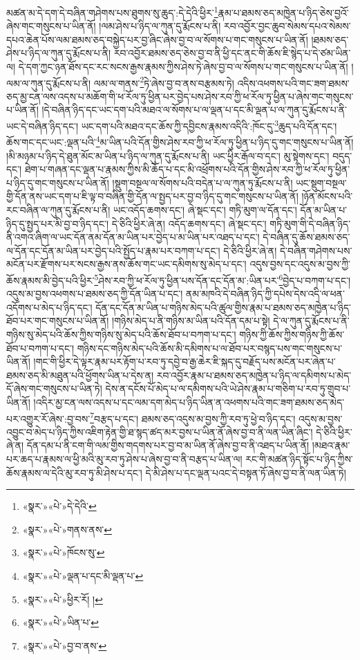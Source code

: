མཚན་མ་དེ་དག་དེ་བཞིན་གཤེགས་པས་ཐུགས་སུ་ཆུད་:དེ་དེའི་ཕྱིར་\footnote{«སྣར་»«པེ་»དེ་དེའི་}རྣམ་པ་ཐམས་ཅད་མཁྱེན་པ་ཉིད་ཅེས་བྱའོ་ཞེས་གང་གསུངས་པ་ཡིན་ནོ། །ལམ་ཤེས་པ་ཉིད་ལ་ཀུན་དུ་རྨོངས་པ་ནི། རབ་འབྱོར་བྱང་ཆུབ་སེམས་དཔའ་སེམས་དཔའ་ཆེན་པོས་ལམ་ཐམས་ཅད་བསྐྱེད་པར་བྱ་ཞིང་ཞེས་བྱ་བ་ལ་སོགས་པ་གང་གསུངས་པ་ཡིན་ནོ། །ཐམས་ཅད་ཤེས་པ་ཉིད་ལ་ཀུན་དུ་རྨོངས་པ་ནི། རབ་འབྱོར་ཐམས་ཅད་ཅེས་བྱ་བ་ནི་ཕྱི་དང་ནང་གི་ཆོས་ཇི་སྙེད་པ་དེ་ཙམ་ཡིན་ལ། དེ་དག་ཀྱང་ཉན་ཐོས་དང་རང་སངས་རྒྱས་རྣམས་ཀྱིས་ཤེས་ཏེ་ཞེས་བྱ་བ་ལ་སོགས་པ་གང་གསུངས་པ་ཡིན་ནོ། །ལམ་ལ་ཀུན་དུ་རྨོངས་པ་ནི། ལམ་ལ་གནས་\footnote{«སྣར་»«པེ་»གནས་ནས་}ཏེ་ཞེས་བྱ་བ་ནས་བརྩམས་ཏེ། འདིས་འཕགས་པའི་གང་ཟག་ཐམས་ཅད་མྱ་ངན་ལས་འདས་པ་མཆོག་གི་ཕ་རོལ་ཏུ་ཕྱིན་པར་བྱེད་པས་ཤེས་རབ་ཀྱི་ཕ་རོལ་ཏུ་ཕྱིན་པ་ཞེས་གང་གསུངས་པ་ཡིན་ནོ། །དེ་བཞིན་ཉིད་དང་ཡང་དག་པའི་མཐའ་ལ་སོགས་པ་ལ་ལྡན་པ་དང་མི་ལྡན་པ་ལ་ཀུན་དུ་རྨོངས་པ་ནི་ཡང་དེ་བཞིན་ཉིད་དང་། ཡང་དག་པའི་མཐའ་དང་ཆོས་ཀྱི་དབྱིངས་རྣམས་འདིའི་:ཁོང་དུ་\footnote{«སྣར་»«པེ་»ཁོངས་སུ་}ཆུད་པའི་དོན་དང་། ཆོས་གང་དང་ཡང་:ལྡན་པའི་\footnote{«སྣར་»«པེ་»ལྡན་པ་དང་མི་ལྡན་པ་}མ་ཡིན་པའི་དོན་གྱིས་ཤེས་རབ་ཀྱི་ཕ་རོལ་ཏུ་ཕྱིན་པ་ཉིད་དུ་གང་གསུངས་པ་ཡིན་ནོ། །མི་མཉམ་པ་ཉིད་དེ་ཐུན་མོང་མ་ཡིན་པ་ཉིད་ལ་ཀུན་དུ་རྨོངས་པ་ནི། ཡང་ཕྱིར་རྒོལ་བ་དང་། མུ་སྟེགས་དང་། བདུད་དང་། ཐེག་པ་གཞན་དང་ལྡན་པ་རྣམས་ཀྱིས་མི་ཆོད་པ་དང་མི་འཕྲོགས་པའི་དོན་གྱིས་ཤེས་རབ་ཀྱི་ཕ་རོལ་ཏུ་ཕྱིན་པ་ཉིད་དུ་གང་གསུངས་པ་ཡིན་ནོ། །སྡུག་བསྔལ་ལ་སོགས་པའི་བདེན་པ་ལ་ཀུན་ཏུ་རྨོངས་པ་ནི། ཡང་སྡུག་བསྔལ་གྱི་དོན་ནས་ཡང་དག་པ་ཇི་ལྟ་བ་བཞིན་གྱི་དོན་ལ་སྤྱད་པར་བྱ་བ་ཉིད་དུ་གང་གསུངས་པ་ཡིན་ནོ། །ཉོན་མོངས་པའི་རང་བཞིན་ལ་ཀུན་དུ་རྨོངས་པ་ནི། ཡང་འདོད་ཆགས་དང་། ཞེ་སྡང་དང་། གཏི་མུག་ལ་དོན་དང་། དོན་མ་ཡིན་པ་ཉིད་དུ་སྤྱད་པར་མི་བྱ་བ་ཉིད་དང་། དེ་ཅིའི་ཕྱིར་ཞེ་ན། འདོད་ཆགས་དང་། ཞེ་སྡང་དང་། གཏི་མུག་གི་དེ་བཞིན་ཉིད་ནི་འགའ་ཞིག་ལ་ཡང་དོན་ནམ་དོན་མ་ཡིན་པར་བྱེད་པ་མ་ཡིན་པར་འཐད་པ་དང་། དེ་བཞིན་དུ་ཆོས་ཐམས་ཅད་ལ་དོན་དང་དོན་མ་ཡིན་པར་བྱེད་པའི་སྤྱོད་པ་རྣམ་པར་བཀག་པ་དང་། དེ་ཅིའི་ཕྱིར་ཞེ་ན། དེ་བཞིན་གཤེགས་པས་མངོན་པར་རྫོགས་པར་སངས་རྒྱས་ནས་ཆོས་གང་ཡང་དམིགས་སུ་མེད་པ་དང་། འདུས་བྱས་དང་འདུས་མ་བྱས་ཀྱི་ཆོས་རྣམས་མི་བྱེད་པའི་ཕྱིར་\footnote{«སྣར་»«པེ་»ཕྱིར་རོ། །}ཤེས་རབ་ཀྱི་ཕ་རོལ་ཏུ་ཕྱིན་པས་དོན་དང་དོན་མ་:ཡིན་པར་\footnote{«སྣར་»«པེ་»ཡིན་པ་}བྱེད་པ་བཀག་པ་དང་། འདུས་མ་བྱས་འཕགས་པ་ཐམས་ཅད་ཀྱི་དོན་ཡིན་པ་དང་། ནམ་མཁའི་དེ་བཞིན་ཉིད་ཀྱི་དཔེས་དེས་འདི་ལ་ཕན་འདོགས་པ་མེད་པ་ཉིད་དང་། དོན་དང་དོན་མ་ཡིན་པ་གཉིས་མེད་པའི་ཚུལ་གྱིས་རྣམ་པ་ཐམས་ཅད་མཁྱེན་པ་ཉིད་ཐོབ་པར་གང་གསུངས་པ་ཡིན་ནོ། །གཉིས་མེད་པ་ནི་གཉིས་མ་ཡིན་པའི་དོན་དམ་པ་སྟེ། དེ་ལ་ཀུན་དུ་རྨོངས་པ་ནི་གཉིས་སུ་མེད་པའི་ཆོས་ཀྱིས་གཉིས་སུ་མེད་པའི་ཆོས་ཐོབ་པ་བཀག་པ་དང་། གཉིས་ཀྱི་ཆོས་ཀྱིས་གཉིས་ཀྱི་ཆོས་ཐོབ་པ་བཀག་པ་དང་། གཉིས་དང་གཉིས་མེད་པའི་ཆོས་མི་དམིགས་པ་ལ་ཐོབ་པར་བསྙད་པས་གང་གསུངས་པ་ཡིན་ནོ། །གང་གི་ཕྱིར་དེ་ལྟར་རྣམ་པར་རྟོག་པ་རབ་ཏུ་དབྱེ་བ་རྒྱ་ཆེར་ཇི་སྐད་དུ་བརྗོད་པས་མངོན་པར་ཞེན་པ་ཐམས་ཅད་མི་མཐུན་པའི་ཕྱོགས་ཡིན་པ་དེས་ན། རབ་འབྱོར་རྣམ་པ་ཐམས་ཅད་མཁྱེན་པ་ཉིད་ལ་དམིགས་པ་མེད་དོ་ཞེས་གང་གསུངས་པ་ཡིན་ཏེ། དེས་ན་དངོས་པོ་མེད་པ་ལ་དམིགས་པའི་ཡེ་ཤེས་རྣམ་པ་གཅིག་པ་རབ་ཏུ་གྲུབ་པ་ཡིན་ནོ། །འདིར་མྱ་ངན་ལས་འདས་པ་དང་ལམ་དག་མེད་པ་ཉིད་ཡིན་ན་འཕགས་པའི་གང་ཟག་ཐམས་ཅད་མེད་པར་འགྱུར་རོ་ཞེས་:བྱ་བས་\footnote{«སྣར་»«པེ་»བྱ་བ་ནས་}བརྩད་པ་དང་། ཐམས་ཅད་འདུས་མ་བྱས་ཀྱི་རབ་ཏུ་ཕྱེ་བ་ཉིད་དང་། འདུས་མ་བྱས་འབྱུང་བ་མེད་པ་ཉིད་ཀྱིས་འཇིག་རྟེན་གྱི་ཐ་སྙད་ཚད་མར་བྱས་པ་ཡིན་ནོ་ཞེས་བྱ་བ་ནི་ལན་ཡིན་ཞིང་། དེ་ཅིའི་ཕྱིར་ཞེ་ན། དོན་དམ་པ་ནི་ངག་གི་ལམ་གྱིས་གདགས་པར་བྱ་བ་མ་ཡིན་ནོ་ཞེས་བྱ་བ་ནི་འཐད་པ་ཡིན་ནོ། །མཐའ་རྣམ་པར་ཆད་པ་རྣམས་ལ་ཕྱི་མའི་མུ་རབ་ཏུ་ཤེས་པ་ཞེས་བྱ་བ་ནི་བརྩད་པ་ཡིན་ལ། རང་གི་མཚན་ཉིད་སྟོང་པ་ཉིད་ཀྱིས་ཆོས་རྣམས་ལ་དེའི་མུ་རབ་ཏུ་མི་ཤེས་པ་དང་། དེ་མི་ཤེས་པ་དང་ལྡན་པའང་དེ་བསྟན་ཏོ་ཞེས་བྱ་བ་ནི་ལན་ཡིན་ཏེ། 